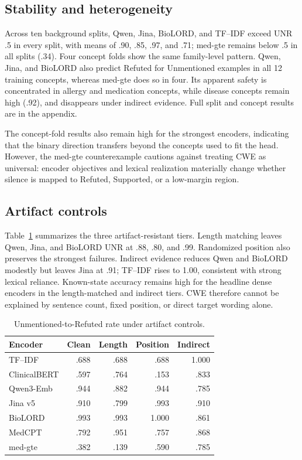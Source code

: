 \documentclass[11pt]{article}
\begin{document}
\subsection{Stability and heterogeneity}
Across ten background splits, Qwen, Jina, BioLORD, and TF--IDF exceed UNR .5
in every split, with means of .90, .85, .97, and .71; med-gte remains below .5
in all splits (.34). Four concept folds show the same family-level pattern.
Qwen, Jina, and BioLORD also predict Refuted for Unmentioned examples in all 12
training concepts, whereas med-gte does so in four. Its apparent safety is
concentrated in allergy and medication concepts, while disease concepts remain
high (.92), and disappears under indirect evidence. Full split and concept
results are in the appendix.

The concept-fold results also remain high for the strongest encoders, indicating
that the binary direction transfers beyond the concepts used to fit the head.
However, the med-gte counterexample cautions against treating CWE as universal:
encoder objectives and lexical realization materially change whether silence is
mapped to Refuted, Supported, or a low-margin region.

\subsection{Artifact controls}
Table~\ref{tab:artifact} summarizes the three artifact-resistant tiers.
Length matching leaves Qwen, Jina, and BioLORD UNR at .88, .80, and .99.
Randomized position also preserves the strongest failures. Indirect evidence reduces Qwen and BioLORD modestly but leaves Jina at .91;
TF--IDF rises to 1.00, consistent with strong lexical reliance. Known-state
accuracy remains high for the headline dense encoders in the length-matched and
indirect tiers. CWE therefore cannot be explained by sentence count, fixed
position, or direct target wording alone.


\begin{table}[t]
  \centering
  \scriptsize
  \setlength{\tabcolsep}{2.5pt}
  \renewcommand{\arraystretch}{1.05}
  \caption{Unmentioned-to-Refuted rate under artifact controls.}
  \label{tab:artifact}
  \begin{tabular*}{\columnwidth}{@{\extracolsep{\fill}}lrrrr@{}}
    \toprule
    \textbf{Encoder} & \textbf{Clean} & \textbf{Length} &
    \textbf{Position} & \textbf{Indirect} \\
    \midrule
    TF--IDF      & .688 & .688 & .688 & 1.000 \\
    ClinicalBERT & .597 & .764 & .153 & .833 \\
    Qwen3-Emb    & .944 & .882 & .944 & .785 \\
    Jina v5      & .910 & .799 & .993 & .910 \\
    BioLORD      & .993 & .993 & 1.000 & .861 \\
    MedCPT       & .792 & .951 & .757 & .868 \\
    med-gte      & .382 & .139 & .590 & .785 \\
    \bottomrule
  \end{tabular*}
\end{table}
\end{document}
